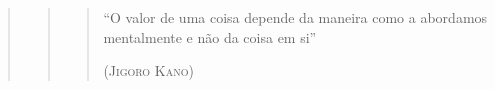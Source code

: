 \clearpage
\begin{flushright}
\mbox{}\vfill

{\sffamily\itshape
	\begin{quote}
		\begin{quote}
			\begin{quotation}
			``O valor de uma coisa depende da maneira como a abordamos mentalmente e não da coisa em si'' \\
			
			\begin{flushright}
			\textsc{(Jigoro Kano)}
		  	\end{flushright}
		  	
		\end{quotation}
		\end{quote}
	\end{quote}
 }




\end{flushright}
